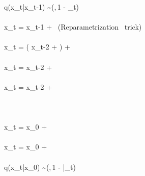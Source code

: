 q(x_{t}|x_{t-1}) \sim {}(,\,1 - \alpha_{t}) \\\\

x_{t} =  x_{t-1} + \epsilon \ (Reparametrization \ trick) \\\\

x_{t} =  ( x_{t-2} + \epsilon) +  \epsilon \\\\

x_{t} =  x_{t-2} +  \epsilon \\\\

x_{t} =  x_{t-2} +  \epsilon \\\\

\cdots \\\\

x_{t} =  x_{0} +  \epsilon \\\\

x_{t} =  x_{0} +  \epsilon \\\\

q(x_{t}|x_{0}) \sim {}(,\,1 - \bar{\alpha_{t}})